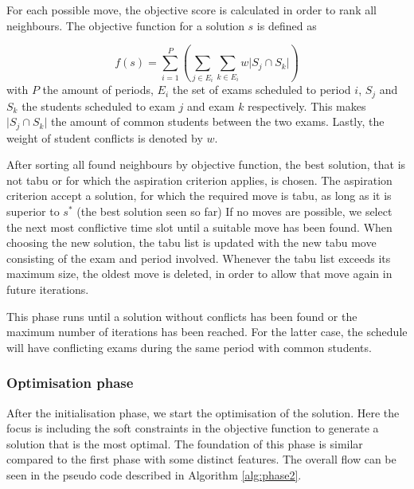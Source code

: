 For each possible move, the objective score is calculated in order to rank all neighbours. The objective function for a solution $s$ is defined as

\begin{equation}
    f(s) = \sum_{i=1}^{P} \left( \sum_{j \in E_i}^{}\sum_{k \in E_i}^{}w \lvert S_j \cap S_k \rvert \right)
\end{equation}
with $P$ the amount of periods, $E_i$ the set of exams scheduled to period $i$, $S_j$ and $S_k$ the students scheduled to exam $j$ and exam $k$ respectively. This makes $\lvert S_j \cap S_k \rvert$ the amount of common students between the two exams. Lastly, the weight of student conflicts is denoted by $w$.

After sorting all found neighbours by objective function, the best solution, that is not tabu or for which the aspiration criterion applies, is chosen. The aspiration criterion accept a solution, for which the required move is tabu, as long as it is superior to $s^*$ (the best solution seen so far) If no moves are possible, we select the next most conflictive time slot until a suitable move has been found. When choosing the new solution, the tabu list is updated with the new tabu move consisting of the exam and period involved. Whenever the tabu list exceeds its maximum size, the oldest move is deleted, in order to allow that move again in future iterations.

This phase runs until a solution without conflicts has been found or the maximum number of iterations has been reached. For the latter case, the schedule will have conflicting exams during the same period with common students.

\subsubsection{Optimisation phase}

After the initialisation phase, we start the optimisation of the solution. Here the focus is including the soft constraints in the objective function to generate a solution that is the most optimal. The foundation of this phase is similar compared to the first phase with some distinct features. The overall flow can be seen in the pseudo code described in Algorithm \ref{alg:phase2}.

